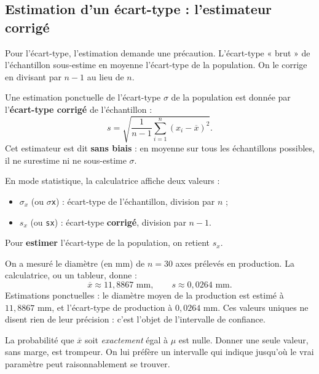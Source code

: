 \documentclass[a4paper,11pt]{article}
\begin{document}
\subsection{Estimation d'un écart-type : l'estimateur corrigé}

Pour l'écart-type, l'estimation demande une précaution. L'écart-type « brut » de l'échantillon sous-estime en moyenne l'écart-type de la population. On le corrige en divisant par $n-1$ au lieu de $n$.

\begin{theoreme}
Une estimation ponctuelle de l'écart-type $\sigma$ de la population est donnée par l'\textbf{écart-type corrigé} de l'échantillon :
\[
s = \sqrt{\frac{1}{n-1}\sum_{i=1}^{n}\left(x_i - \overline{x}\right)^2}.
\]
Cet estimateur est dit \textbf{sans biais} : en moyenne sur tous les échantillons possibles, il ne surestime ni ne sous-estime $\sigma$.
\end{theoreme}

\begin{calculatrice}
En mode statistique, la calculatrice affiche deux valeurs :
\begin{itemize}
  \item $\sigma_x$ (ou \texttt{$\sigma$x}) : écart-type de l'échantillon, division par $n$ ;
  \item $s_x$ (ou \texttt{sx}) : écart-type \textbf{corrigé}, division par $n-1$.
\end{itemize}
Pour \textbf{estimer} l'écart-type de la population, on retient $\boxed{s_x}$.
\end{calculatrice}

\begin{exemple}
On a mesuré le diamètre (en mm) de $n = 30$ axes prélevés en production. La calculatrice, ou un tableur, donne :
\[
\overline{x} \approx 11{,}8867 \text{ mm}, \qquad s \approx 0{,}0264 \text{ mm}.
\]
Estimations ponctuelles : le diamètre moyen de la production est estimé à $11{,}8867$ mm, et l'écart-type de production à $0{,}0264$ mm. Ces valeurs uniques ne disent rien de leur précision : c'est l'objet de l'intervalle de confiance.
\end{exemple}

\begin{attention}
La probabilité que $\overline{x}$ soit \emph{exactement} égal à $\mu$ est nulle. Donner une seule valeur, sans marge, est trompeur. On lui préfère un intervalle qui indique jusqu'où le vrai paramètre peut raisonnablement se trouver.
\end{attention}
\end{document}
